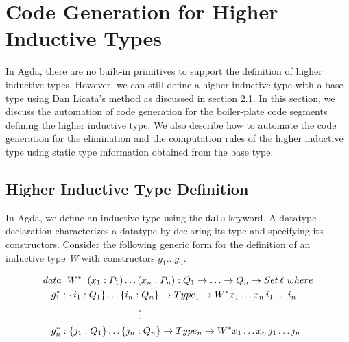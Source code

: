 \documentclass[sigplan,10pt]{acmart}
\begin{document}
\section{Code Generation for Higher Inductive Types}
\label{sec:sec4}

In Agda, there are no built-in primitives to support the definition of higher inductive types. However, we can still define a higher inductive type with a base type using Dan Licata's \citep{Licata-2011} method as discussed in section 2.1. In this section, we discuss the automation of code generation for the boiler-plate code segments defining the higher inductive type. We also describe how to automate the code generation for the elimination and the computation rules of the higher inductive type using static type information obtained from the base type.


\subsection{Higher Inductive Type Definition}
\label{sec:sec4.1}

In Agda, we define an inductive type using the {\tt data} keyword. A datatype declaration characterizes a datatype by declaring its type and specifying its constructors. Consider the following generic form for the definition of an inductive type \emph{W}  with constructors $g_1 \ldots g_n$.
\begin{center}
\begingroup
\fontsize{7.9pt}{0pt}\selectfont
\begin{align}
& data \hspace{0.2cm} W^* \hspace{0.2cm} (x_1:P_1)\ldots(x_n:P_n) : Q_1 \rightarrow\ldots\rightarrow Q_n \rightarrow Set \, \ell \, \, where \nonumber \\
& \hspace{0.3cm} g_1^* : \{i_1 : Q_1\} \ldots \{i_n : Q_n\} \rightarrow Type_1\rightarrow W^* x_1 \ldots x_n \, i_1 \ldots i_n \nonumber \\
& \hspace{3.5cm} \vdots \nonumber \\
& \hspace{0.3cm} g_n^* : \{j_1 : Q_1\} \ldots \{j_n : Q_n\} \rightarrow Type_n\rightarrow W^* x_1 \dots x_n \, j_1 \ldots j_n \nonumber \\ \nonumber
\end{align}
\endgroup
\end{center}
\normalsize
\end{document}
